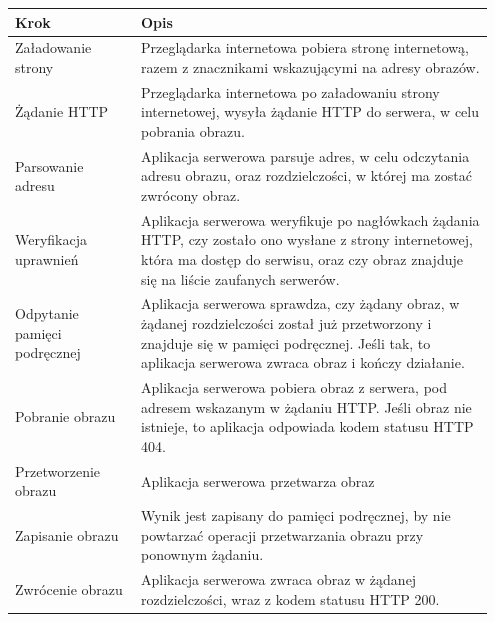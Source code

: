 \begin{table}[!h]
    \centering
    \begin{tabular}{p{0.25\linewidth} | p{0.7\linewidth}}
        \hline
        \textbf{Krok} & \textbf{Opis} \\
		\hline
		Załadowanie strony &
		Przeglądarka internetowa pobiera stronę internetową, razem z znacznikami wskazującymi na adresy obrazów. \\
		\hline
		Żądanie HTTP &
		Przeglądarka internetowa po załadowaniu strony internetowej, wysyła żądanie HTTP do serwera, w celu pobrania obrazu. \\
		\hline
		Parsowanie adresu &
		Aplikacja serwerowa parsuje adres, w celu odczytania adresu obrazu, oraz rozdzielczości, w której ma zostać zwrócony obraz. \\
		\hline
		Weryfikacja uprawnień &
		Aplikacja serwerowa weryfikuje po nagłówkach żądania HTTP, czy zostało ono wysłane z strony internetowej, która ma dostęp do serwisu, oraz czy obraz znajduje się na liście zaufanych serwerów. \\
		\hline
		Odpytanie pamięci podręcznej &
		Aplikacja serwerowa sprawdza, czy żądany obraz, w żądanej rozdzielczości został już przetworzony i znajduje się w pamięci podręcznej.
		Jeśli tak, to aplikacja serwerowa zwraca obraz i kończy działanie. \\
		\hline
		Pobranie obrazu &
		Aplikacja serwerowa pobiera obraz z serwera, pod adresem wskazanym w żądaniu HTTP.
		Jeśli obraz nie istnieje, to aplikacja odpowiada kodem statusu HTTP 404. \\
		\hline
		Przetworzenie obrazu &
		Aplikacja serwerowa przetwarza obraz \\
		\hline
		Zapisanie obrazu &
		Wynik jest zapisany do pamięci podręcznej, by nie powtarzać operacji przetwarzania obrazu przy ponownym żądaniu. \\
		\hline
		Zwrócenie obrazu &
		Aplikacja serwerowa zwraca obraz w żądanej rozdzielczości, wraz z kodem statusu HTTP 200. \\
		\hline
	\end{tabular}
\end{table}

